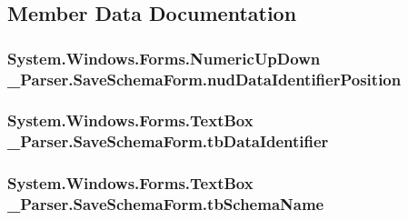 \subsection{Member Data Documentation}
\subsubsection[{\texorpdfstring{nud\+Data\+Identifier\+Position}{nudDataIdentifierPosition}}]{\setlength{\rightskip}{0pt plus 5cm}System.\+Windows.\+Forms.\+Numeric\+Up\+Down \+\_\+Parser.\+Save\+Schema\+Form.\+nud\+Data\+Identifier\+Position}\hypertarget{class__1920_parser_1_1_save_schema_form_afb1dbb18d04daa7d93d504ebf2b28dae}{}\label{class__1920_parser_1_1_save_schema_form_afb1dbb18d04daa7d93d504ebf2b28dae}
\subsubsection[{\texorpdfstring{tb\+Data\+Identifier}{tbDataIdentifier}}]{\setlength{\rightskip}{0pt plus 5cm}System.\+Windows.\+Forms.\+Text\+Box \+\_\+Parser.\+Save\+Schema\+Form.\+tb\+Data\+Identifier}\hypertarget{class__1920_parser_1_1_save_schema_form_a6b4727fdf859c257a72b637ffae15bdc}{}\label{class__1920_parser_1_1_save_schema_form_a6b4727fdf859c257a72b637ffae15bdc}
\subsubsection[{\texorpdfstring{tb\+Schema\+Name}{tbSchemaName}}]{\setlength{\rightskip}{0pt plus 5cm}System.\+Windows.\+Forms.\+Text\+Box \+\_\+Parser.\+Save\+Schema\+Form.\+tb\+Schema\+Name}\hypertarget{class__1920_parser_1_1_save_schema_form_ae4760769155fc202f53ea12b63d14633}{}\label{class__1920_parser_1_1_save_schema_form_ae4760769155fc202f53ea12b63d14633}


